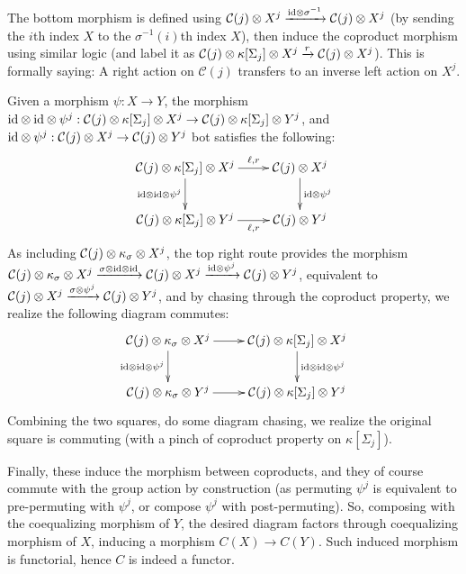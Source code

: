 \documentclass{article}
\begin{document}
The bottom morphism is defined using $\mathcal{C}(j)\otimes X^j\xrightarrow{\mathrm{id}\otimes \sigma^{-1}}\mathcal{C}(j)\otimes X^j$ (by sending the $i$th index $X$ to the $\sigma^{-1}(i)$th index $X$), then induce the coproduct morphism using similar logic (and label it as $\mathcal{C}(j)\otimes \kappa[\Sigma_j]\otimes X^j\xrightarrow{r}\mathcal{C}(j)\otimes X^j$). This is formally saying: A right action on $\mathcal{C}(j)$ transfers to an inverse left action on $X^j$.

\hfil

Given a morphism $\psi:X\rightarrow Y$, the morphism $\mathrm{id}\otimes \mathrm{id} \otimes \psi^j:\mathcal{C}(j)\otimes \kappa[\Sigma_j]\otimes X^j\rightarrow \mathcal{C}(j)\otimes \kappa[\Sigma_j]\otimes Y^j$, and $\mathrm{id} \otimes \psi^j:\mathcal{C}(j)\otimes X^j\rightarrow\mathcal{C}(j)\otimes Y^j$ bot satisfies the following:
\[\xymatrix{
    \mathcal{C}(j)\tensor \kappa[\Sigma_j]\tensor X^j \ar[d]_-{\id\tensor\id\tensor \psi^j}\ar[r]^-{\ell,r} & \mathcal{C}(j)\tensor X^j \ar[d]^-{\id\tensor \psi^j}\\
    \mathcal{C}(j)\tensor \kappa[\Sigma_j]\tensor Y^j\ar[r]_-{\ell,r} & \mathcal{C}(j)\tensor Y^j
}\]
As including $\mathcal{C}(j)\otimes \kappa_\sigma\otimes X^j$, the top right route provides the morphism $\mathcal{C}(j)\otimes\kappa_\sigma\otimes X^j\xrightarrow{\sigma\otimes \mathrm{id}\otimes\mathrm{id}}\mathcal{C}(j)\otimes X^j \xrightarrow{\mathrm{id}\otimes \psi^j} \mathcal{C}(j)\otimes Y^j$, equivalent to $\mathcal{C}(j)\otimes X^j\xrightarrow{\sigma\otimes \psi^j}\mathcal{C}(j)\otimes Y^j$, and by chasing through the coproduct property, we realize the following diagram commutes:
\[\xymatrix{
    \mathcal{C}(j)\tensor \kappa_\sigma\tensor X^j \ar[d]_-{\id\tensor\id\tensor\psi^j} \ar[r] & \mathcal{C}(j)\tensor \kappa[\Sigma_j]\tensor X^j\ar[d]^-{\id\tensor\id\tensor\psi^j}\\
    \mathcal{C}(j)\tensor \kappa_\sigma\tensor Y^j \ar[r] & \mathcal{C}(j)\tensor \kappa[\Sigma_j]\tensor Y^j
}\]
Combining the two squares, do some diagram chasing, we realize the original square is commuting (with a pinch of coproduct property on $\kappa[\Sigma_j]$). 

Finally, these induce the morphism between coproducts, and they of course commute with the group action by construction (as permuting $\psi^j$ is equivalent to pre-permuting with $\psi^j$, or compose $\psi^j$ with post-permuting). So, composing with the coequalizing morphism of $Y$, the desired diagram factors through coequalizing morphism of $X$, inducing a morphism $C(X)\rightarrow C(Y)$. Such induced morphism is functorial, hence $C$ is indeed a functor.
\end{document}

